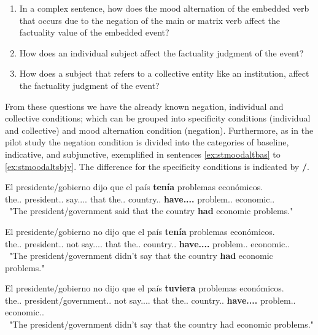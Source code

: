 \begin{enumerate}[RQ1.-]
        \item In a complex sentence, how does the mood alternation of the embedded verb that occurs due to the negation of the main or matrix verb affect the factuality value of the embedded event?
        \item How does an individual subject affect the factuality judgment of the event?
        \item How does a subject that refers to a collective entity like an institution, affect the factuality judgment of the event?
\end{enumerate}

From these questions we have the already known negation, individual and collective conditions; which can be grouped into specificity conditions (individual and collective) and mood alternation condition (negation). Furthermore, as in the pilot study the negation condition is divided into the categories of baseline, indicative, and subjunctive, exemplified in sentences \ref{ex:stmoodaltbas} to \ref{ex:stmoodaltsbjv}. The difference for the specificity conditions is indicated by \textbf{/}.\\

\begin{exe}
  \ex
    \begin{xlist}
      \item  {\gll El presidente/gobierno dijo que el país \textbf{tenía} problemas económicos.\\ the.\M.\Sg{} president.\M.\Sg{} say.\Pst.\Pfv.\Ind.\Tsg{} that the.\M.\Sg{} country.\M.\Sg{} \textbf{have.\Pst.\Ipfv.\Ind.\Tsg{}} problem.\M.\Pl{} economic.\M.\Pl{} \\\ "The president/government said that the country \textbf{had} economic problems."\glt }\label{ex:stmoodaltbas}
      \item  {\gll El presidente/gobierno no dijo que el país \textbf{tenía} problemas económicos.\\ the.\M.\Sg{} president.\M.\Sg{} not say.\Pst.\Pfv.\Ind.\Tsg{} that the.\M.\Sg{} country.\M.\Sg{} \textbf{have.\Pst.\Ipfv.\Ind.\Tsg{}} problem.\M.\Pl{} economic.\M.\Pl{} \\\ "The president/government didn't say that the country \textbf{had} economic problems."\glt }\label{ex:stmoodaltind}
      \item {\gll El presidente/gobierno no dijo que el país \textbf{tuviera} problemas económicos.\\   the.\M.\Sg{} president/government.\M.\Sg{} not say.\Pst.\Pfv.\Ind.\Tsg{} that the.\M.\Sg{} country.\M.\Sg{} \textbf{have.\Pst.\Ipfv.\Sbjv.\Tsg{}} problem.\M.\Pl{} economic.\M.\Pl{} \\\ "The president/government didn't say that the country had economic problems."\glt }\label{ex:stmoodaltsbjv}
    \end{xlist}
\end{exe}

